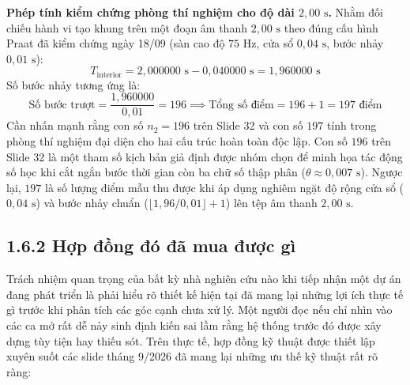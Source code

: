 \documentclass[11pt,a4paper]{article}
\begin{document}
\textbf{Phép tính kiểm chứng phòng thí nghiệm cho độ dài $2{,}00\text{ s}$.} Nhằm đối chiếu hành vi tạo khung trên một đoạn âm thanh $2{,}00\text{ s}$ theo đúng cấu hình Praat đã kiểm chứng ngày 18/09 (sàn cao độ $75\text{ Hz}$, cửa sổ $0{,}04\text{ s}$, bước nhảy $0{,}01\text{ s}$):
\begin{equation}
T_{\text{interior}} = 2{,}000000\text{ s} - 0{,}040000\text{ s} = 1{,}960000\text{ s}
\end{equation}
Số bước nhảy tương ứng là:
\begin{equation}
\text{Số bước trượt} = \frac{1{,}960000}{0{,}01} = 196 \implies \text{Tổng số điểm} = 196 + 1 = 197\text{ điểm}
\end{equation}
Cần nhấn mạnh rằng con số $n_2 = 196$ trên Slide 32 và con số $197$ tính trong phòng thí nghiệm đại diện cho hai cấu trúc hoàn toàn độc lập. Con số $196$ trên Slide 32 là một tham số kịch bản giả định được nhóm chọn để minh họa tác động số học khi cắt ngắn bước thời gian còn ba chữ số thập phân ($\theta \approx 0{,}007\text{ s}$). Ngược lại, $197$ là số lượng điểm mẫu thu được khi áp dụng nghiêm ngặt độ rộng cửa sổ ($0{,}04\text{ s}$) và bước nhảy chuẩn ($\lfloor 1{,}96 / 0{,}01 \rfloor + 1$) lên tệp âm thanh $2{,}00\text{ s}$.

\subsection*{1.6.2 Hợp đồng đó đã mua được gì}

Trách nhiệm quan trọng của bất kỳ nhà nghiên cứu nào khi tiếp nhận một dự án đang phát triển là phải hiểu rõ thiết kế hiện tại đã mang lại những lợi ích thực tế gì trước khi phân tích các góc cạnh chưa xử lý. Một người đọc nếu chỉ nhìn vào các ca mở rất dễ nảy sinh định kiến sai lầm rằng hệ thống trước đó được xây dựng tùy tiện hay thiếu sót. Trên thực tế, hợp đồng kỹ thuật được thiết lập xuyên suốt các slide tháng 9/2026 đã mang lại những ưu thế kỹ thuật rất rõ ràng:
\end{document}
